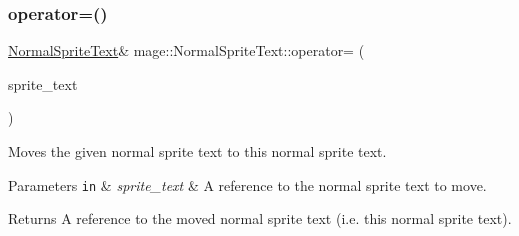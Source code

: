 \subsubsection{\texorpdfstring{operator=()}{operator=()}\hspace{0.1cm}{\footnotesize\ttfamily [2/2]}}
{\footnotesize\ttfamily \hyperlink{classmage_1_1_normal_sprite_text}{Normal\+Sprite\+Text}\& mage\+::\+Normal\+Sprite\+Text\+::operator= (\begin{DoxyParamCaption}\item[{\hyperlink{classmage_1_1_normal_sprite_text}{Normal\+Sprite\+Text} \&\&}]{sprite\+\_\+text }\end{DoxyParamCaption})\hspace{0.3cm}{\ttfamily [delete]}}

Moves the given normal sprite text to this normal sprite text.


\begin{DoxyParams}[1]{Parameters}
\mbox{\tt in}  & {\em sprite\+\_\+text} & A reference to the normal sprite text to move. \\
\hline
\end{DoxyParams}
\begin{DoxyReturn}{Returns}
A reference to the moved normal sprite text (i.\+e. this normal sprite text). 
\end{DoxyReturn}

